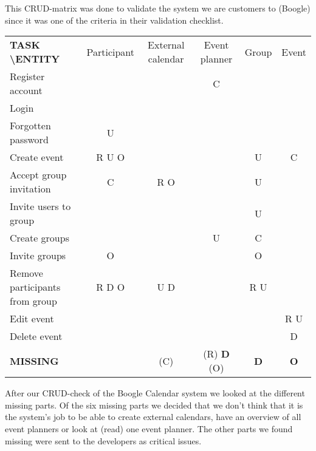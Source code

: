 \documentclass[a4paper]{article}
\begin{document}
				This CRUD-matrix was done to validate the system we are customers to (Boogle) since it was one of the criteria in their validation checklist.
			
	\begin{center}
		
		
			\begin{tabular}{|l||c|c|c|c|c|}
			\hline 
			\textbf{TASK \textbackslash ENTITY} & Participant & External calendar & Event planner & Group & Event \\ 
			\hhline{|=||=|=|=|=|=|}
			Register account & & & C & & \\ 
			\hline 
			Login & & & & & \\ 
			\hline 
			Forgotten password & U & & & & \\ 
			\hline 
			Create event & R U O & & & U & C \\ 
			\hline 
			Accept group invitation & C & R O & & U & \\ 
			\hline 
			Invite users to group & & & & U & \\ 
			\hline 
			Create groups & & & U & C & \\ 
			\hline 
			Invite groups & O & & & O & \\ 
			\hline 
			Remove participants from group & R D O & U D & & R U & \\ 
			\hline 
			Edit event & & & & & R U \\ 
			\hline 
			Delete event & & & & & D \\ 
			\hhline{|=||=|=|=|=|=|}
			\textbf{MISSING} & & (C) & (R) \textbf{D} (O) & \textbf{D} & \textbf{O} \\ 
			\hline 
			\end{tabular} 
	
		\end{center}
			After our CRUD-check of the Boogle Calendar system we looked at the different missing parts. Of the six missing parts we decided that we don't think that it is the system's job to be able to create external calendars, have an overview of all event planners or look at (read) one event planner. The other parts we found missing were sent to the developers as critical issues.

			
\end{document}
